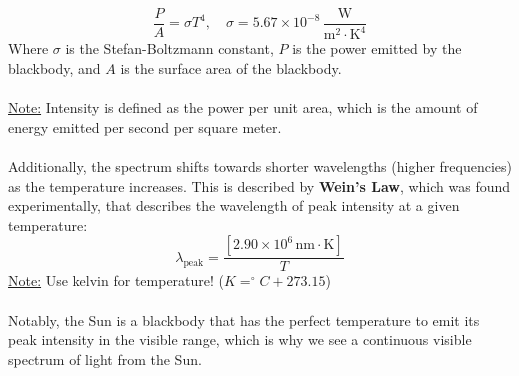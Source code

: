 \documentclass[12pt]{article}
\begin{document}
\[\boxed{\frac{P}{A} = \sigma T^4, \quad \sigma=5.67 \times 10^{-8} \,\frac{\text{W}}{\text{m}^2 \cdot \text{K}^4}}\]
Where $\sigma$ is the Stefan-Boltzmann constant, $P$ is the power emitted by the blackbody, and $A$ is the surface area of the blackbody.\\\\
\underline{Note:} Intensity is defined as the power per unit area, which is the amount of energy emitted per second per square meter.\\\\
Additionally, the spectrum shifts towards shorter wavelengths (higher frequencies) as the temperature increases.
This is described by \textbf{Wein's Law}, which was found experimentally, that describes the wavelength of peak intensity at a given temperature:
\[\boxed{\lambda_\text{peak} = \frac{[2.90\times10^6\,\text{nm}\cdot\text{K}]}{T}}\]
\underline{Note:} Use kelvin for temperature! ($K = ^\circ C + 273.15$)\\\\
Notably, the Sun is a blackbody that has the perfect temperature to emit its peak intensity in the visible range, which is why we see a continuous visible spectrum of light from the Sun.
\end{document}
